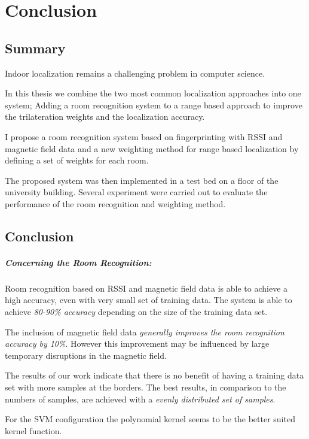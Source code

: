 \chapter{Conclusion}

\label{Chapter6}

\section{Summary}


Indoor localization remains a challenging problem in computer science.

In this thesis we combine the two most common localization approaches into one system; Adding a room recognition system to a range based approach to improve the trilateration weights and the localization accuracy.

I propose a room recognition system based on fingerprinting with RSSI and magnetic field data and a new weighting method for range based localization by defining a set of weights for each room.

The proposed system was then implemented in a test bed on a floor of the university building. Several experiment were carried out to evaluate the performance of the room recognition and weighting method.

\section{Conclusion}

\paragraph{Concerning the Room Recognition:}
Room recognition based on RSSI and magnetic field data is able to achieve a high accuracy, even with very small set of training data. The system is able to achieve \emph{80-90\% accuracy} depending on the size of the training data set.

The inclusion of magnetic field data \emph{generally improves the room recognition accuracy by 10\%}. However this improvement may be influenced by large temporary disruptions in the magnetic field.

The results of our work indicate that there is no benefit of having a training data set with more samples at the borders. The best results, in comparison to the numbers of samples, are achieved with a \emph{evenly distributed set of samples}. 
 
For the SVM configuration the polynomial kernel seems to be the better suited kernel function.


